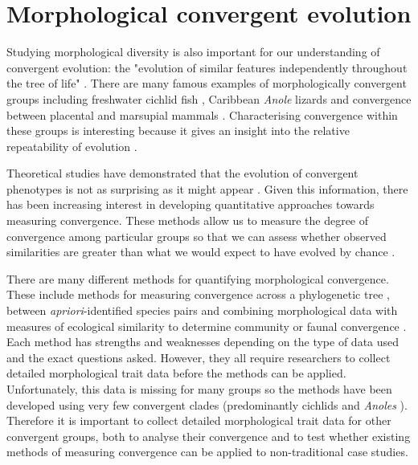 \section{Morphological convergent evolution}

	Studying morphological diversity is also important for our understanding of convergent evolution: the "evolution of similar features independently throughout the tree of life" \citep[Futuyma 1998, cited in][]{Losos2011}. There are many famous examples of morphologically convergent groups including freshwater cichlid fish \citep{Muschick2012}, Caribbean \textit{Anole} lizards %
	 \citep{Mahler2013} and convergence between placental and marsupial mammals \citep{Wroe2007}. Characterising convergence within these groups is interesting because it gives an insight into the relative repeatability of evolution \citep{Losos2011}.


	Theoretical studies have demonstrated that the evolution of convergent phenotypes is not as surprising as it might appear \citep{Stayton2008}. Given this information, there has been increasing interest in developing quantitative approaches towards measuring convergence. These methods allow us to measure the degree of convergence among particular groups so that we can assess whether observed similarities are greater than what we would expect to have evolved by chance \citep[e.g.][]{Muschick2012}.
	
	There are many different methods for quantifying morphological convergence. These include methods for measuring convergence across a phylogenetic tree \citep{Stayton2008}, between \textit{apriori}-identified species pairs \citep{Arbuckle2014, Muschick2012, Stayton2006} and combining morphological data with measures of ecological similarity to determine community or faunal convergence \citep{Ingram2013, Mahler2013, Moen2013, Melville2006}. Each method has strengths and weaknesses depending on the type of data used and the exact questions asked. However, they all require researchers to collect detailed morphological trait data before the methods can be applied. Unfortunately, this data is missing for many groups so the methods have been developed using very few convergent clades (predominantly cichlids and \textit{Anoles} %
	). Therefore it is important to collect detailed morphological trait data for other convergent groups, both to analyse their convergence and to test whether existing methods of measuring convergence can be applied to non-traditional case studies.
